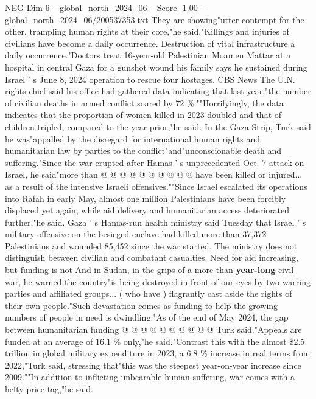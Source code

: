 \begin{textsample}{NEG Dim 6 – global\_north\_2024\_06 – Score -1.00 – global\_north\_2024\_06/200537353.txt}  \label{ex:f6_neg_309}
They are showing"utter contempt for the other, trampling human rights at their core,"he said."Killings and injuries of civilians have become a daily occurrence.
Destruction of vital infrastructure a daily occurrence."Doctors treat 16-year-old Palestinian Moamen Mattar at a hospital in central Gaza for a gunshot wound his family says he sustained during Israel ' s June 8, 2024 operation to rescue four hostages.
CBS News The U.N. rights chief said his office had gathered data indicating that last year,"the number of civilian deaths in armed conflict soared by 72 \%.""Horrifyingly, the data indicates that the proportion of women killed in 2023 doubled and that of children tripled, compared to the year prior,"he said.
In the Gaza Strip, Turk said he was"appalled by the disregard for international human rights and humanitarian law by parties to the conflict"and"unconscionable death and suffering."Since the war erupted after Hamas ' s unprecedented Oct. 7 attack on Israel, he said"more than @ @ @ @ @ @ @ @ @ @ have been killed or injured... as a result of the intensive Israeli offensives.""Since Israel escalated its operations into Rafah in early May, almost one million Palestinians have been forcibly displaced yet again, while aid delivery and humanitarian access deteriorated further,"he said.
Gaza ' s Hamas-run health ministry said Tuesday that Israel ' s military offensive on the besieged enclave had killed more than 37,372 Palestinians and wounded 85,452 since the war started.
The ministry does not distinguish between civilian and combatant casualties.
Need for aid increasing, but funding is not And in Sudan, in the grips of a more than \textbf{year-long} civil war, he warned the country"is being destroyed in front of our eyes by two warring parties and affiliated groups... ( who have ) flagrantly cast aside the rights of their own people."Such devastation comes as funding to help the growing numbers of people in need is dwindling."As of the end of May 2024, the gap between humanitarian funding @ @ @ @ @ @ @ @ @ @ Turk said."Appeals are funded at an average of 16.1 \% only,"he said."Contrast this with the almost \$2.5 trillion in global military expenditure in 2023, a 6.8 \% increase in real terms from 2022,"Turk said, stressing that"this was the steepest year-on-year increase since 2009.""In addition to inflicting unbearable human suffering, war comes with a hefty price tag,"he said.

\end{textsample}
